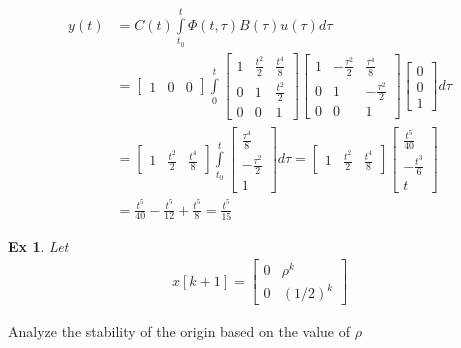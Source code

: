 \documentclass[twoside]{article}
\newtheorem{exmp}[theorem]{Ex}
\begin{document}
\begin{align*}
	y(t) &= C(t) \int\limits_{t_0}^{t} \Phi(t , \tau) B(\tau) u(\tau) d\tau 
	\\
	&= \begin{bmatrix} 1 & 0 & 0 \end{bmatrix}  \int\limits_{0}^{t} \begin{bmatrix} 1 & \frac{t^2}{2} & \frac{t^4}{8} \\ 0 & 1 & \frac{t^2}{2} \\ 0 & 0 & 1 \end{bmatrix} 
	\begin{bmatrix} 1 & -\frac{\tau^2}{2} & \frac{\tau^4}{8}  \\ 0 & 1 & -\frac{\tau^2}{2} \\ 0 & 0 & 1 \end{bmatrix} \begin{bmatrix} 0 \\ 0 \\ 1 \end{bmatrix}  d\tau 
	\\
	&= \begin{bmatrix} 1 & \frac{t^2}{2} & \frac{t^4}{8} \end{bmatrix}  \int\limits_{t_0}^{t} \begin{bmatrix} \frac{\tau^4}{8} \\ -\frac{\tau^2}{2} \\ 1 \end{bmatrix} d\tau 
	= \begin{bmatrix} 1 & \frac{t^2}{2} & \frac{t^4}{8} \end{bmatrix} \begin{bmatrix} \frac{t^5}{40} \\ -\frac{t^3}{6} \\ t \end{bmatrix} 
	\\
	&= \frac{t^5}{40} - \frac{t^5}{12} + \frac{t^5}{8} = \frac{t^5}{15}
\end{align*}
%

\begin{exmp}
 Let 
 \begin{align*}
  x[k+1] = \begin{bmatrix} 0 & \rho^k  \\ 0 & (1/2)^k \end{bmatrix}
 \end{align*}
\end{exmp}
Analyze the stability of the origin based on the value of $\rho$
\end{document}
